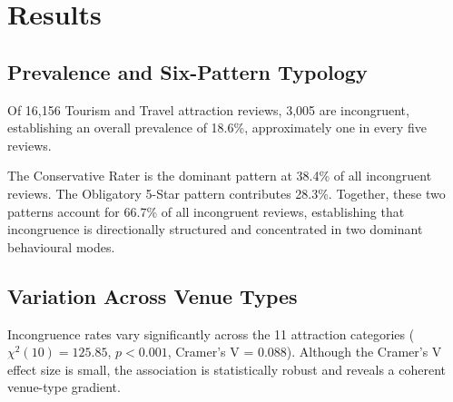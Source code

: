 \documentclass[conference]{IEEEtran}
\begin{document}
\section{Results}
\subsection{Prevalence and Six-Pattern Typology}
Of 16,156 Tourism and Travel attraction reviews, 3,005 are incongruent, establishing an overall prevalence of 18.6\%, approximately one in every five reviews.

\begin{table}[htbp]
\caption{Six Directional Incongruence Patterns ($n=3,005$ incongruent reviews)}
\label{tab:six_patterns}
\centering
{}
\end{table}

The Conservative Rater is the dominant pattern at 38.4\% of all incongruent reviews. The Obligatory 5-Star pattern contributes 28.3\%. Together, these two patterns account for 66.7\% of all incongruent reviews, establishing that incongruence is directionally structured and concentrated in two dominant behavioural modes.

\subsection{Variation Across Venue Types}
Incongruence rates vary significantly across the 11 attraction categories ($\chi^2(10)=125.85$, $p<0.001$, Cramer's V = 0.088). Although the Cramer's V effect size is small, the association is statistically robust and reveals a coherent venue-type gradient.
\end{document}
